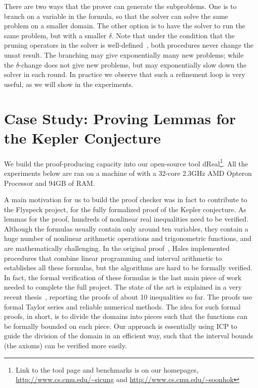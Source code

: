 \documentclass[envcountsect]{llncs}
\begin{document}
There are two ways that the prover can generate the subproblems. One is to
branch on a variable in the formula, so that the solver can solve the same
problem on a smaller domain. The other option is to have the solver to run the
same problem, but with a smaller $\delta$. Note that under the condition that
the pruning operators in the solver is
well-defined~\cite{}, both procedures never change the
{\sf unsat} result. The branching may give
exponentially many new problems; while the $\delta$-change does not give new
problems, but may exponentially slow down the solver in each round. In practice
we observe that such a refinement loop is very useful, as we will show in the
experiments. 

\section{Case Study: Proving Lemmas for the Kepler Conjecture}\label{kepler}

We build the proof-producing capacity into our open-source tool
dReal\footnote{Link to the
tool page and benchmarks is on our homepages,
\url{http://www.cs.cmu.edu/~sicung} and
\url{http://www.cs.cmu.edu/~soonhok}}. All the experiments below are ran on a
machine of with a 32-core 2.3GHz AMD Opteron Processor and 94GB of RAM.

A main motivation for us to build
the proof checker was in fact to contribute to the Flyspeck project, for the
fully formalized proof of the Kepler conjecture. As lemmas for the proof,
hundreds of nonlinear real inequalities need to be verified. Although the
formulas usually contain only around ten variables, they contain a huge number
of nonlinear arithmetic operations and trigonometric functions, and are
mathematically challenging. In the original proof~\cite{}, Hales implemented
procedures that combine linear programming and interval arithmetic to
establishes all these formulas, but the algorithms are hard to be formally
verified. In fact, the formal verification of these formulas is the last main
piece of work needed to complete the full project. The state of the art is
explained in a very recent thesis~\cite{}, reporting the proofs of about 10
inequalities so far. The proofs use formal Taylor series and reliable
numerical methods. The idea for such formal proofs, in short, is to divide the
domains into pieces such that the functions can be formally bounded on each
piece. Our approach is essentially using ICP to guide the division of the domain
in an efficient way, such that the interval bounds (the axioms) can be
verified more easily. 
\end{document}

